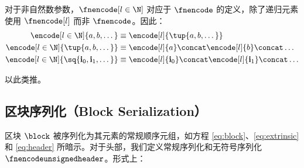 对于非自然数参数，$\fnencode[l \in \N]$ 对应于 $\fnencode$ 的定义，除了递归元素使用 $\fnencode[l]$ 而非 $\fnencode$。因此：
\begin{align}
  \encode[l \in \N]{a, b, \dots} &\equiv \encode[l]{\tup{a, b, \dots}}\\
  \encode[l \in \N]{\tup{a, b, \dots}} &\equiv \encode[l]{a} \concat \encode[l]{b} \concat \dots\\
  \encode[l \in \N]{\sq{\mathbf{i}_0, \mathbf{i}_1, \dots}} &\equiv \encode[l]{\mathbf{i}_0} \concat \encode[l]{\mathbf{i}_1} \concat \dots
\end{align}

以此类推。

\subsection{区块序列化（Block Serialization）}

区块 $\block$ 被序列化为其元素的常规顺序元组，如方程 \ref{eq:block}、\ref{eq:extrinsic} 和 \ref{eq:header} 所暗示。对于头部，我们定义常规序列化和无符号序列化 $\fnencodeunsignedheader$。形式上：

